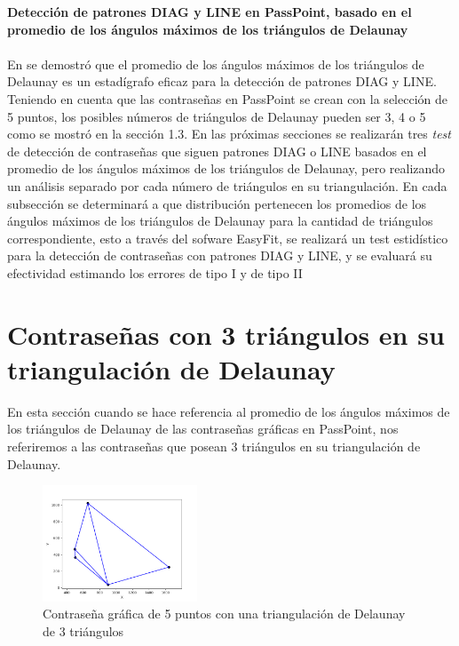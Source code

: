 \documentclass[12pt]{report}
\begin{document}
\vspace{-2em} %

\noindent\textbf{\LARGE Detección de patrones DIAG y LINE en PassPoint, basado en el promedio de los ángulos máximos de los triángulos de Delaunay}\\
\vspace{2em}
\\	
En \cite{13} se demostró que el promedio de los ángulos máximos de los triángulos de Delaunay es un estadígrafo eficaz para la detección de patrones DIAG y LINE. Teniendo en cuenta que las contraseñas en PassPoint se crean con la selección de 5 puntos, los posibles números de triángulos de Delaunay pueden ser 3, 4 o 5 como se mostró en la sección 1.3. En las próximas secciones se realizarán tres \textit{test} de detección de contraseñas  que siguen patrones DIAG o LINE basados en el promedio de los ángulos  máximos de los triángulos de Delaunay, pero  realizando un análisis separado por cada número de triángulos en su triangulación.
En cada subsección se determinará a que distribución pertenecen los promedios de los ángulos máximos de los triángulos de Delaunay para la cantidad de triángulos correspondiente, esto a través  del sofware EasyFit, se realizará un test estidístico para la detección de contraseñas con patrones DIAG y LINE, y se evaluará su efectividad estimando los errores de  tipo I y de tipo II 


\setcounter{section}{0}
\section{Contraseñas con 3 triángulos en su triangulación de Delaunay }
En esta sección cuando se hace referencia  al promedio de los ángulos máximos de los triángulos de Delaunay  de las contraseñas gráficas en PassPoint, nos referiremos a las contraseñas que posean 3 triángulos en su triangulación de Delaunay.
	\begin{figure}[ht]
	\centering
	
	\includegraphics[width=0.41\textwidth]{alea3td.png}
	\caption{Contraseña gráfica de 5 puntos con una triangulación de Delaunay de 3 triángulos}
	\label{3TD}
\end{figure}
\end{document}
